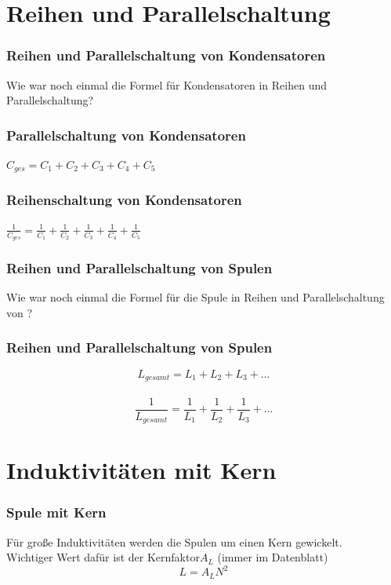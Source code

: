 \section*{Reihen und Parallelschaltung}

\begin{frame}
    \frametitle{Reihen und Parallelschaltung von Kondensatoren}
    \begin{center}
		\huge Wie war noch einmal die Formel für Kondensatoren in Reihen und Parallelschaltung?
    \end{center}
 \end{frame}
 
 \begin{frame}
    \frametitle{Parallelschaltung von Kondensatoren}	
 	\huge{$C_{ges} = C_{1} + C_{2} + C_{3} + C_{4} + C_{5}$} 
\end{frame}
    
\begin{frame}
    \frametitle{Reihenschaltung von Kondensatoren}
    \begin{center}
		\huge{$\frac{1}{C_{ges}} = \frac{1}{ C_{1}} + \frac{1}{C_{2}} + \frac{1}{C_{3}} + \frac{1}{C_{4}} + \frac{1}{C_{5}}$}\\
    \end{center}
\end{frame}

\begin{frame}
    \frametitle{Reihen und Parallelschaltung von Spulen}
    \begin{center}
		\huge Wie war noch einmal die Formel für die Spule in Reihen und Parallelschaltung von ?
    \end{center}
\end{frame}

\begin{frame}
    \frametitle{Reihen und Parallelschaltung von Spulen}
    
    $$L_{gesamt} = L_1 + L_2 + L_3 + ...$$\\
	$$\frac{1}{L_{gesamt}} = \frac{1}{L_1} + \frac{1}{L_2} + \frac{1}{L_3} + ...$$
\end{frame}

\section*{Induktivitäten mit Kern}

\begin{frame}
    \frametitle{Spule mit Kern}
    \begin{center}
		Für große Induktivitäten werden die Spulen um einen Kern gewickelt.\\
		Wichtiger Wert dafür ist der Kernfaktor\huge $A_{L}$ \normalsize(immer im Datenblatt)
	\huge	$$L = A_{L} N^2$$
    \end{center}
 \end{frame}
 
